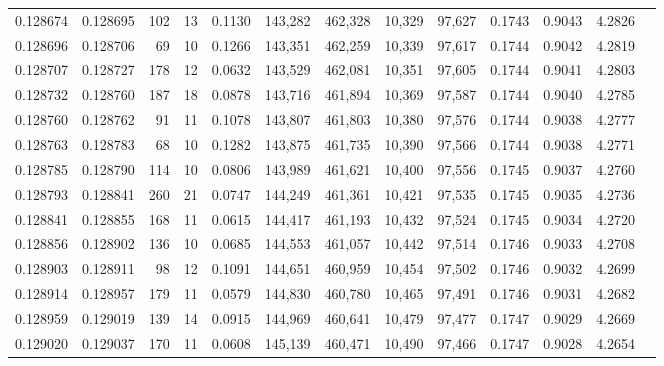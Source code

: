 \begin{tabular}{rrrrrrrrrrrrr}
0.128674 & 0.128695 &   102 &  13 &                                     0.1130 & 143,282 & 462,328 &  10,329 &  97,627 & 0.1743 & 0.9043 & 4.2826 \\
0.128696 & 0.128706 &    69 &  10 &                                     0.1266 & 143,351 & 462,259 &  10,339 &  97,617 & 0.1744 & 0.9042 & 4.2819 \\
0.128707 & 0.128727 &   178 &  12 &                                     0.0632 & 143,529 & 462,081 &  10,351 &  97,605 & 0.1744 & 0.9041 & 4.2803 \\
0.128732 & 0.128760 &   187 &  18 &                                     0.0878 & 143,716 & 461,894 &  10,369 &  97,587 & 0.1744 & 0.9040 & 4.2785 \\
0.128760 & 0.128762 &    91 &  11 &                                     0.1078 & 143,807 & 461,803 &  10,380 &  97,576 & 0.1744 & 0.9038 & 4.2777 \\
0.128763 & 0.128783 &    68 &  10 &                                     0.1282 & 143,875 & 461,735 &  10,390 &  97,566 & 0.1744 & 0.9038 & 4.2771 \\
0.128785 & 0.128790 &   114 &  10 &                                     0.0806 & 143,989 & 461,621 &  10,400 &  97,556 & 0.1745 & 0.9037 & 4.2760 \\
0.128793 & 0.128841 &   260 &  21 &                                     0.0747 & 144,249 & 461,361 &  10,421 &  97,535 & 0.1745 & 0.9035 & 4.2736 \\
0.128841 & 0.128855 &   168 &  11 &                                     0.0615 & 144,417 & 461,193 &  10,432 &  97,524 & 0.1745 & 0.9034 & 4.2720 \\
0.128856 & 0.128902 &   136 &  10 &                                     0.0685 & 144,553 & 461,057 &  10,442 &  97,514 & 0.1746 & 0.9033 & 4.2708 \\
0.128903 & 0.128911 &    98 &  12 &                                     0.1091 & 144,651 & 460,959 &  10,454 &  97,502 & 0.1746 & 0.9032 & 4.2699 \\
0.128914 & 0.128957 &   179 &  11 &                                     0.0579 & 144,830 & 460,780 &  10,465 &  97,491 & 0.1746 & 0.9031 & 4.2682 \\
0.128959 & 0.129019 &   139 &  14 &                                     0.0915 & 144,969 & 460,641 &  10,479 &  97,477 & 0.1747 & 0.9029 & 4.2669 \\
0.129020 & 0.129037 &   170 &  11 &                                     0.0608 & 145,139 & 460,471 &  10,490 &  97,466 & 0.1747 & 0.9028 & 4.2654 \\

\end{tabular}
